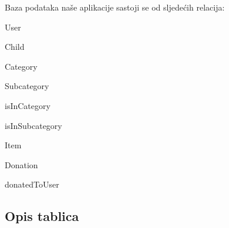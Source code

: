 		\vspace{15pt}

		Baza podataka naše aplikacije sastoji se od sljedećih relacija:
		\begin{packed_item}
			\item User
			\item Child
			\item Category
			\item Subcategory
			\item isInCategory
			\item isInSubcategory
			\item Item
			\item Donation
			\item donatedToUser
		\end{packed_item}
			
			\eject
			\subsection{Opis tablica}
			
